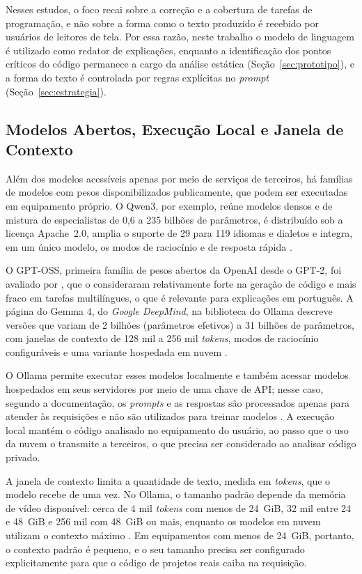 \documentclass[
    12pt,                   %
    openright,              %
    oneside,                %
    a4paper,                %
    sumario=tradicional,    %
    english,                %
    brazil,                 %
    ]{abntex2}
\begin{document}
Nesses estudos, o foco recai sobre a correção e a cobertura de tarefas de programação, e não sobre a forma como o texto produzido é recebido por usuários de leitores de tela. Por essa razão, neste trabalho o modelo de linguagem é utilizado como redator de explicações, enquanto a identificação dos pontos críticos do código permanece a cargo da análise estática (Seção~\ref{sec:prototipo}), e a forma do texto é controlada por regras explícitas no \textit{prompt} (Seção~\ref{sec:estrategia}).

\subsection{Modelos Abertos, Execução Local e Janela de Contexto}\label{sec:modelosabertos}

Além dos modelos acessíveis apenas por meio de serviços de terceiros, há famílias de modelos com pesos disponibilizados publicamente, que podem ser executadas em equipamento próprio. O Qwen3, por exemplo, reúne modelos densos e de mistura de especialistas de 0,6 a 235 bilhões de parâmetros, é distribuído sob a licença Apache~2.0, amplia o suporte de 29 para 119 idiomas e dialetos e integra, em um único modelo, os modos de raciocínio e de resposta rápida \cite{yang2025qwen3}. 

O GPT-OSS, primeira família de pesos abertos da OpenAI desde o GPT-2, foi avaliado por \textcite{bi2025gptoss}, que o consideraram relativamente forte na geração de código e mais fraco em tarefas multilíngues, o que é relevante para explicações em português. A página do Gemma 4, do \textit{Google DeepMind}, na biblioteca do Ollama descreve versões que variam de 2 bilhões (parâmetros efetivos) a 31 bilhões de parâmetros, com janelas de contexto de 128 mil a 256 mil \textit{tokens}, modos de raciocínio configuráveis e uma variante hospedada em nuvem \cite{ollama2026gemma4}. 


O Ollama permite executar esses modelos localmente e também acessar modelos hospedados em seus servidores por meio de uma chave de API; nesse caso, segundo a documentação, os \textit{prompts} e as respostas são processados apenas para atender às requisições e não são utilizados para treinar modelos \cite{ollama2026nuvem}. A execução local mantém o código analisado no equipamento do usuário, ao passo que o uso da nuvem o transmite a terceiros, o que precisa ser considerado ao analisar código privado.

A janela de contexto limita a quantidade de texto, medida em \textit{tokens}, que o modelo recebe de uma vez. No Ollama, o tamanho padrão depende da memória de vídeo disponível: cerca de 4 mil \textit{tokens} com menos de 24~GiB, 32 mil entre 24 e 48~GiB e 256 mil com 48~GiB ou mais, enquanto os modelos em nuvem utilizam o contexto máximo \cite{ollama2026contexto}. Em equipamentos com menos de 24~GiB, portanto, o contexto padrão é pequeno, e o seu tamanho precisa ser configurado explicitamente para que o código de projetos reais caiba na requisição.
\end{document}
